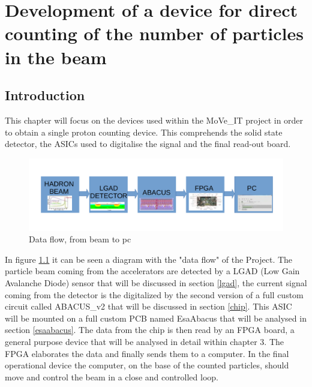 \chapter{Development of a device for direct counting of the number of particles in the beam}

\section{Introduction}
This chapter will focus on the devices used within the MoVe\_IT project in order to obtain a single proton counting device.
This comprehends the solid state detector, the ASICs used to digitalise the signal and the final read-out board.
\begin{figure}[H]
	\centering
	\includegraphics[width=0.99\linewidth]{IMG/ch2/BLOCK}
	\caption{Data flow, from beam to pc}
	\label{fig:block}
\end{figure}
\noindent In figure \ref{fig:block} it can be seen a diagram with the "data flow" of the Project.
The particle beam coming from the accelerators are detected by a LGAD (Low Gain Avalanche Diode) sensor that will be discussed in section \ref{lgad}, the current signal coming from the detector is the digitalized by the second version of a full custom circuit called ABACUS\_v2 that will be discussed in section \ref{chip}.
This ASIC will be mounted on a full custom PCB named EsaAbacus that will be analysed in section \ref{esaabacus}.
The data from the chip is then read by an FPGA board, a general purpose device that will be analysed in detail within chapter 3.
The FPGA elaborates the data and finally sends them to a computer. In the final operational device the computer, on the base of the counted particles, should move and control the beam in a close and controlled loop. 

